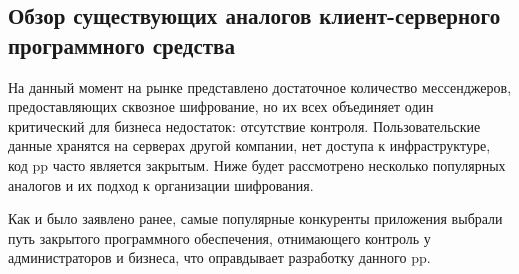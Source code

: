 \subsection{Обзор существующих аналогов клиент-серверного программного средства}
\label{sec:analysis:research:analogs}

На данный момент на рынке представлено достаточное количество мессенджеров, предоставляющих сквозное шифрование, но их всех объединяет один критический для бизнеса недостаток: отсутствие контроля. 
Пользовательские данные хранятся на серверах другой компании, нет доступа к инфраструктуре, код \gls{pp} часто является закрытым. Ниже будет рассмотрено несколько популярных аналогов и их подход к организации шифрования.




Как и было заявлено ранее, самые популярные конкуренты приложения выбрали путь закрытого программного обеспечения, отнимающего контроль у администраторов и бизнеса, что оправдывает разработку данного \gls{pp}.
